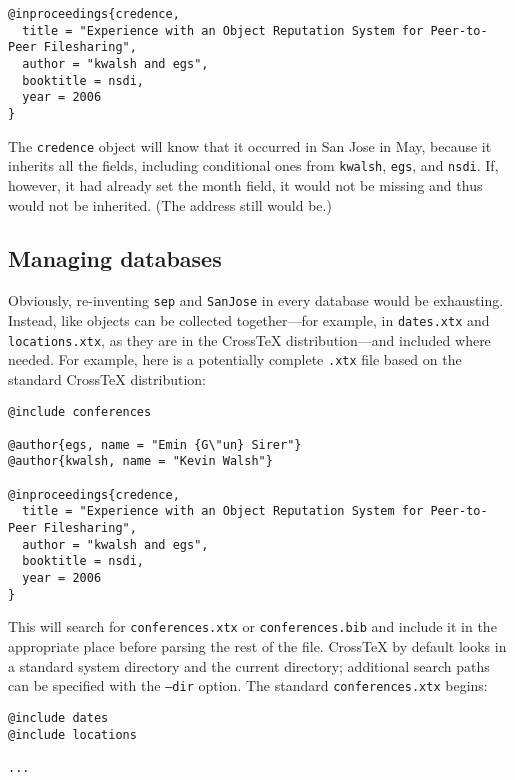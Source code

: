 \documentclass{article}
\newcommand{\XTeX}{Cross\TeX}
\begin{document}
\begin{small}\begin{verbatim}
@inproceedings{credence,
  title = "Experience with an Object Reputation System for Peer-to-Peer Filesharing",
  author = "kwalsh and egs",
  booktitle = nsdi,
  year = 2006
}
\end{verbatim}\end{small}

The \texttt{credence} object will know that it occurred in San Jose in May, because it inherits all the fields, including conditional ones from \texttt{kwalsh}, \texttt{egs}, and \texttt{nsdi}. If, however, it had already set the month field, it would not be missing and thus would not be inherited. (The address still would be.)


\subsection{Managing databases}

Obviously, re-inventing \texttt{sep} and \texttt{SanJose} in every database would be exhausting. Instead, like objects can be collected together---for example, in \texttt{dates.xtx} and \texttt{locations.xtx}, as they are in the \XTeX{} distribution---and included where needed. For example, here is a potentially complete \texttt{.xtx} file based on the standard \XTeX{} distribution:

\begin{small}\begin{verbatim}
@include conferences

@author{egs, name = "Emin {G\"un} Sirer"}
@author{kwalsh, name = "Kevin Walsh"}

@inproceedings{credence,
  title = "Experience with an Object Reputation System for Peer-to-Peer Filesharing",
  author = "kwalsh and egs",
  booktitle = nsdi,
  year = 2006
}
\end{verbatim}\end{small}

This will search for \texttt{conferences.xtx} or \texttt{conferences.bib} and include it in the appropriate place before parsing the rest of the file. \XTeX{} by default looks in a standard system directory and the current directory; additional search paths can be specified with the \texttt{--dir} option. The standard \texttt{conferences.xtx} begins:

\begin{small}\begin{verbatim}
@include dates
@include locations

...
\end{verbatim}\end{small}
\end{document}
